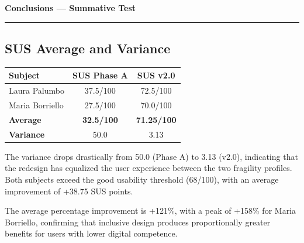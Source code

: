 ﻿\documentclass[11pt,a4paper]{article}
\begin{document}
\newpage
\begin{center}
  {\color{primaryColor}\large\bfseries Conclusions --- Summative Test}\\
  \vspace{0.1cm}
  \color{borderColor}\hrule
\end{center}

\vspace{0.5cm}

\subsection*{SUS Average and Variance}
\begin{tcolorbox}[base]
\begin{center}
\renewcommand{\arraystretch}{1.3}
\begin{tabular}{lcc}
\toprule
\textbf{Subject} & \textbf{SUS Phase A} & \textbf{SUS v2.0} \\
\midrule
Laura Palumbo  & 37.5/100 & 72.5/100 \\
Maria Borriello & 27.5/100 & 70.0/100 \\
\midrule
\textbf{Average} & \textbf{32.5/100} & \textbf{71.25/100} \\
\textbf{Variance} & 50.0 & 3.13 \\
\bottomrule
\end{tabular}
\end{center}

\medskip

The variance drops drastically from 50.0 (Phase A) to 3.13
(v2.0), indicating that the redesign has equalized the user
experience between the two fragility profiles. Both subjects
exceed the good usability threshold (68/100), with an
average improvement of +38.75 SUS points.

\medskip

The average percentage improvement is +121\%, with a peak
of +158\% for Maria Borriello, confirming that inclusive
design produces proportionally greater benefits for
users with lower digital competence.
\end{tcolorbox}
\end{document}
